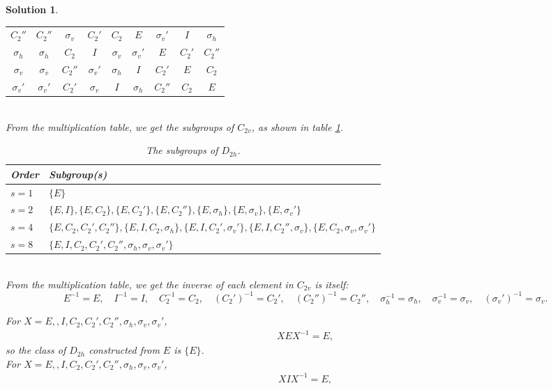 \documentclass[UTF8,10pt,a4paper]{article}
\theoremstyle{Problem}
\theoremstyle{Solution}
\newtheorem*{sol}{Solution}
\begin{document}
\begin{sol}
\begin{enumerate}
\begin{table}[h]
\begin{tabular}{c|cccccccc}
               $C_2''$ & $C_2''$ & $\sigma_v$ & $C_2'$ & $C_2$ & $E$ & $\sigma_v'$ & $I$ & $\sigma_h$ \\
               $\sigma_h$ & $\sigma_h$ & $C_2$ & $I$ & $\sigma_v$ & $\sigma_v'$ & $E$ & $C_2'$ & $C_2''$ \\
               $\sigma_v$ & $\sigma_v$ & $C_2''$ & $\sigma_v'$ & $\sigma_h$ & $I$ & $C_2'$ & $E$ & $C_2$ \\
               $\sigma_v'$ & $\sigma_v'$ & $C_2'$ & $\sigma_v$ & $I$ & $\sigma_h$ & $C_2''$ & $C_2$ & $E$
            \end{tabular}
    \end{table}
    \\From the multiplication table, we get the subgroups of $C_{2v}$, as shown in table \ref{5-D2h-sg}.
    \begin{table}[h]
        \centering
        \caption{The subgroups of $D_{2h}$.}
        \label{5-D2h-sg}
        \begin{tabular}{ll}
            \hline
            Order & Subgroup(s) \\ \hline
            $s=1$ & $\{E\}$ \\
            $s=2$ & $\{E,I\},\{E,C_2\},\{E,C_2'\},\{E,C_2''\},\{E,\sigma_h\},\{E,\sigma_v\},\{E,\sigma_v'\}$ \\
            $s=4$ & $\{E,C_2,C_2',C_2''\},\{E,I,C_2,\sigma_h\},\{E,I,C_2',\sigma_v'\},\{E,I,C_2'',\sigma_v\},\{E,C_2,\sigma_v,\sigma_v'\}$ \\
            $s=8$ & $\{E,I,C_2,C_2',C_2'',\sigma_h,\sigma_v,\sigma_v'\}$ \\ \hline
        \end{tabular}
    \end{table}
    \\From the multiplication table, we get the inverse of each element in $C_{2v}$ is itself:
    \[
        E^{-1}=E,\quad I^{-1}=I,\quad C_2^{-1}=C_2,\quad(C_2')^{-1}=C_2',\quad(C_2'')^{-1}=C_2'',\quad\sigma_h^{-1}=\sigma_h,\quad\sigma_v^{-1}=\sigma_v,\quad(\sigma_v')^{-1}=\sigma_v.
    \]
    \end{enumerate}
    For $X=E,,I,C_2,C_2',C_2'',\sigma_h,\sigma_v,\sigma_v'$,
    \begin{align}
        XEX^{-1}=E,
    \end{align}
    so the class of $D_{2h}$ constructed from $E$ is $\{E\}$.\\
    For $X=E,,I,C_2,C_2',C_2'',\sigma_h,\sigma_v,\sigma_v'$,
    \begin{align}
        XIX^{-1}=E,

\end{align}
\end{sol}
\end{document}
